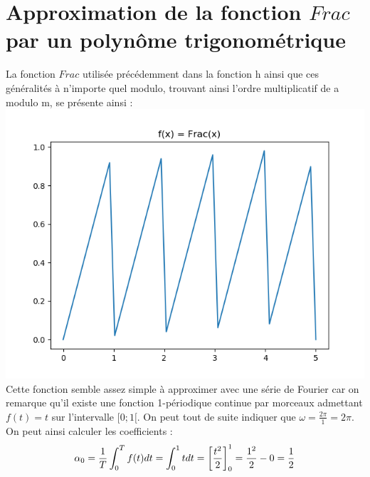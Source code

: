 \documentclass{article}
\begin{document}
\section{Approximation de la fonction $Frac$ par un polynôme trigonométrique}
La fonction $Frac$ utilisée précédemment dans la fonction h ainsi que ces généralités à n'importe quel modulo, trouvant ainsi l'ordre multiplicatif de a modulo m, se présente ainsi :\\
\includegraphics{images/Figure_4.png}\\
Cette fonction semble assez simple à approximer avec une série de Fourier car on remarque qu'il existe une fonction 1-périodique continue par morceaux admettant $f(t) = t$ sur l'intervalle $[0;1[$. On peut tout de suite indiquer que $\omega=\frac{2\pi}{1}=2\pi$. On peut ainsi calculer les coefficients : \\
\begin{equation}
\begin{split}
\alpha_0 & = \frac{1}{T}\int_{0}^{T}f(t)dt = \int_{0}^{1}tdt = \left[\frac{t^2}{2}\right]^1_0 =\frac{1^2}{2}-0=\frac{1}{2}\\\\\notag
\end{split}
\end{equation}
\end{document}
